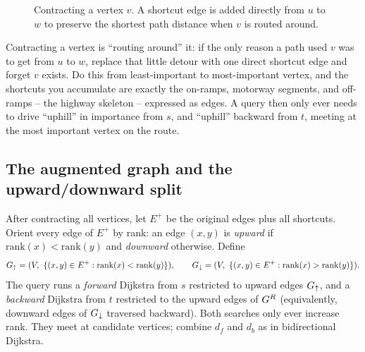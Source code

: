 \begin{figure}[htbp]
\centering
{}
\caption{Contracting a vertex $v$. A shortcut edge is added directly from $u$ to $w$ to preserve the shortest path distance when $v$ is routed around.}
\label{fig:ch08:ch-shortcut}
\end{figure}

\begin{intuitionbox}
Contracting a vertex is ``routing around'' it: if the only reason a path used $v$
was to get from $u$ to $w$, replace that little detour with one direct shortcut
edge and forget $v$ exists. Do this from least-important to most-important
vertex, and the shortcuts you accumulate are exactly the on-ramps, motorway
segments, and off-ramps -- the highway skeleton -- expressed as edges. A query
then only ever needs to drive ``uphill'' in importance from $s$, and ``uphill''
backward from $t$, meeting at the most important vertex on the route.
\end{intuitionbox}

\subsection{The augmented graph and the upward/downward split}

After contracting all vertices, let $E^{+}$ be the original edges plus all
shortcuts. Orient every edge of $E^{+}$ by rank: an edge $(x,y)$ is
\emph{upward} if $\mathrm{rank}(x)<\mathrm{rank}(y)$ and \emph{downward}
otherwise. Define
\[
  G_\uparrow=(V,\ \{(x,y)\in E^{+}: \mathrm{rank}(x)<\mathrm{rank}(y)\}),
  \qquad
  G_\downarrow=(V,\ \{(x,y)\in E^{+}: \mathrm{rank}(x)>\mathrm{rank}(y)\}).
\]
The query runs a \emph{forward} Dijkstra from $s$ restricted to upward edges
$G_\uparrow$, and a \emph{backward} Dijkstra from $t$ restricted to the
upward edges of $G^{R}$ (equivalently, downward edges of $G_\downarrow$
traversed backward). Both searches only ever increase rank. They meet at
candidate vertices; combine $d_f$ and $d_b$ as in bidirectional Dijkstra.

